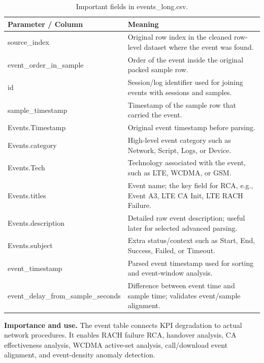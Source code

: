 \documentclass[12pt,a4paper]{article}
\begin{document}
\begin{table}[H]
\centering
\begin{tabularx}{\textwidth}{P{0.38\textwidth}Y}
\toprule
\textbf{Parameter / Column} & \textbf{Meaning} \\
\midrule
{\ttfamily source\_\allowbreak{}index} & Original row index in the cleaned row-level dataset where the event was found. \\
{\ttfamily event\_\allowbreak{}order\_\allowbreak{}in\_\allowbreak{}sample} & Order of the event inside the original packed sample row. \\
{\ttfamily id} & Session/log identifier used for joining events with sessions and samples. \\
{\ttfamily sample\_\allowbreak{}timestamp} & Timestamp of the sample row that carried the event. \\
{\ttfamily Events.\allowbreak{}Timestamp} & Original event timestamp before parsing. \\
{\ttfamily Events.\allowbreak{}category} & High-level event category such as Network, Script, Logs, or Device. \\
{\ttfamily Events.\allowbreak{}Tech} & Technology associated with the event, such as LTE, WCDMA, or GSM. \\
{\ttfamily Events.\allowbreak{}titles} & Event name; the key field for RCA, e.g., Event A3, LTE CA Init, LTE RACH Failure. \\
{\ttfamily Events.\allowbreak{}description} & Detailed raw event description; useful later for selected advanced parsing. \\
{\ttfamily Events.\allowbreak{}subject} & Extra status/context such as Start, End, Success, Failed, or Timeout. \\
{\ttfamily event\_\allowbreak{}timestamp} & Parsed event timestamp used for sorting and event-window analysis. \\
{\ttfamily event\_\allowbreak{}delay\_\allowbreak{}from\_\allowbreak{}sample\_\allowbreak{}seconds} & Difference between event time and sample time; validates event/sample alignment. \\
\bottomrule
\end{tabularx}
\caption{Important fields in events\_long.csv.}
\end{table}


\textbf{Importance and use.} The event table connects KPI degradation to actual network procedures. It enables RACH failure RCA, handover analysis, CA effectiveness analysis, WCDMA active-set analysis, call/download event alignment, and event-density anomaly detection.
\end{document}

